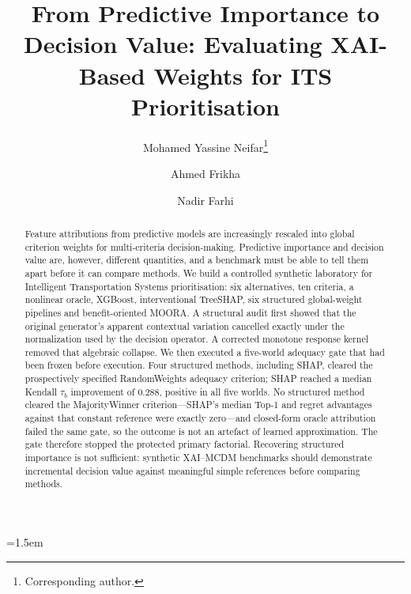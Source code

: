 \documentclass[runningheads,orivec]{llncs}
\newif\ifanon
\newcommand{\XGB}{XGBoost}
\newcommand{\MOORA}{MOORA}
\begin{document}
\emergencystretch=1.5em

\title{From Predictive Importance to Decision Value: Evaluating XAI-Based
Weights for ITS Prioritisation}

\ifanon
  \author{Anonymous Author(s)}
  \authorrunning{Anonymous Author(s)}
  \institute{Anonymous Institution(s)}
\else
  \author{Mohamed Yassine Neifar\thanks{Corresponding author.} \and
  Ahmed Frikha \and
  Nadir Farhi}
\fi

\maketitle

\begin{abstract}
Feature attributions from predictive models are increasingly rescaled into global
criterion weights for multi-criteria decision-making. Predictive importance and
decision value are, however, different quantities, and a benchmark must be able to
tell them apart before it can compare methods. We build a controlled synthetic
laboratory for Intelligent Transportation Systems prioritisation: six alternatives,
ten criteria, a nonlinear oracle, \XGB, interventional TreeSHAP, six structured
global-weight pipelines and benefit-oriented \MOORA. A structural audit first showed
that the original generator's apparent contextual variation cancelled exactly under
the normalization used by the decision operator. A corrected monotone response kernel
removed that algebraic collapse. We then executed a five-world adequacy gate that had
been frozen before execution. Four structured methods, including SHAP, cleared the
prospectively specified RandomWeights adequacy criterion; SHAP reached a median
Kendall $\tau_b$ improvement of $0.288$, positive in all five worlds. No structured
method cleared the MajorityWinner criterion---SHAP's median Top-1 and regret
advantages against that constant reference were exactly zero---and closed-form oracle
attribution failed the same gate, so the outcome is not an artefact of learned
approximation. The gate therefore stopped the protected primary factorial. Recovering
structured importance is not sufficient: synthetic XAI--MCDM benchmarks should
demonstrate incremental decision value against meaningful simple references before
comparing methods.

\end{abstract}
\end{document}
